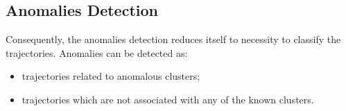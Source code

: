\subsection{Anomalies Detection}

Consequently, the anomalies detection reduces itself to necessity to classify the trajectories. Anomalies can be detected as:

\begin{itemize}
	\setlength\itemsep{0em}
	\item trajectories related to anomalous clusters;
	\item trajectories which are not associated with any of the known clusters.
\end{itemize}




